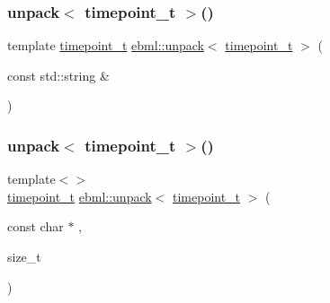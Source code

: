 \mbox{\label{namespaceebml_ac97339d25d5dab88390116547e0ef400}} 
\subsubsection{\texorpdfstring{unpack$<$ timepoint\+\_\+t $>$()}{unpack< timepoint\_t >()}\hspace{0.1cm}{\footnotesize\ttfamily [1/2]}}
{\footnotesize\ttfamily template \mbox{\hyperlink{namespaceebml_a7e667ec3fe8b51fb5b8f9690734d8638}{timepoint\+\_\+t}} \mbox{\hyperlink{namespaceebml_a55a0f9d0c93e80d488021fd03c4f3861}{ebml\+::unpack}}$<$ \mbox{\hyperlink{namespaceebml_a7e667ec3fe8b51fb5b8f9690734d8638}{timepoint\+\_\+t}} $>$ (\begin{DoxyParamCaption}\item[{const std\+::string \&}]{ }\end{DoxyParamCaption})}

\mbox{\label{namespaceebml_a939a46f36f4c7e9eaf14bc0ea612256c}} 
\subsubsection{\texorpdfstring{unpack$<$ timepoint\+\_\+t $>$()}{unpack< timepoint\_t >()}\hspace{0.1cm}{\footnotesize\ttfamily [2/2]}}
{\footnotesize\ttfamily template$<$$>$ \\
\mbox{\hyperlink{namespaceebml_a7e667ec3fe8b51fb5b8f9690734d8638}{timepoint\+\_\+t}} \mbox{\hyperlink{namespaceebml_a55a0f9d0c93e80d488021fd03c4f3861}{ebml\+::unpack}}$<$ \mbox{\hyperlink{namespaceebml_a7e667ec3fe8b51fb5b8f9690734d8638}{timepoint\+\_\+t}} $>$ (\begin{DoxyParamCaption}\item[{const char $\ast$}]{,  }\item[{size\+\_\+t}]{ }\end{DoxyParamCaption})}

\mbox{\label{namespaceebml_a9631ff473950f82b6cb6302b2126d277}} 
